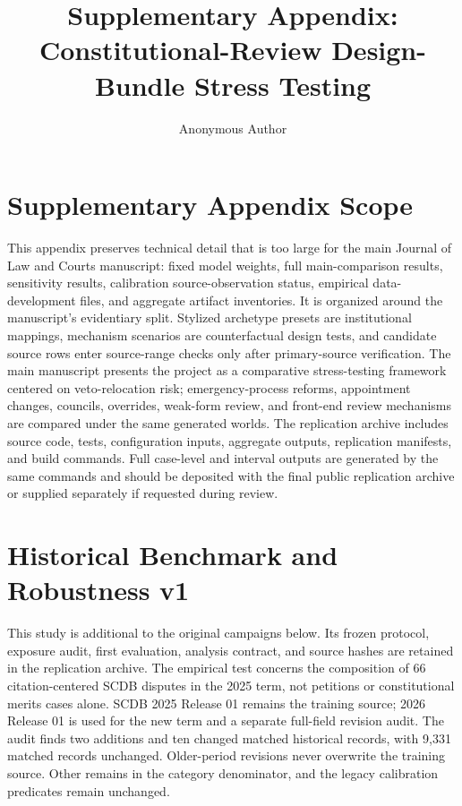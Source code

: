 \documentclass[
  journal=small,
  manuscript=research-article,
  year=2026
]{cup-journal}
\title{Supplementary Appendix: Constitutional-Review Design-Bundle Stress Testing}
\author{Anonymous Author}
\affiliation{Manuscript prepared for anonymous review}
\date{}
\begin{document}
\maketitle

\section*{Supplementary Appendix Scope}

This appendix preserves technical detail that is too large for the main Journal of Law and Courts manuscript: fixed model weights, full main-comparison results, sensitivity results, calibration source-observation status, empirical data-development files, and aggregate artifact inventories. It is organized around the manuscript's evidentiary split. Stylized archetype presets are institutional mappings, mechanism scenarios are counterfactual design tests, and candidate source rows enter source-range checks only after primary-source verification. The main manuscript presents the project as a comparative stress-testing framework centered on veto-relocation risk; emergency-process reforms, appointment changes, councils, overrides, weak-form review, and front-end review mechanisms are compared under the same generated worlds. The replication archive includes source code, tests, configuration inputs, aggregate outputs, replication manifests, and build commands. Full case-level and interval outputs are generated by the same commands and should be deposited with the final public replication archive or supplied separately if requested during review.

\section*{Historical Benchmark and Robustness v1}

This study is additional to the original campaigns below. Its frozen protocol, exposure audit, first evaluation, analysis contract, and source hashes are retained in the replication archive. The empirical test concerns the composition of 66 citation-centered SCDB disputes in the 2025 term, not petitions or constitutional merits cases alone. SCDB 2025 Release 01 remains the training source; 2026 Release 01 is used for the new term and a separate full-field revision audit. The audit finds two additions and ten changed matched historical records, with 9,331 matched records unchanged. Older-period revisions never overwrite the training source. Other remains in the category denominator, and the legacy calibration predicates remain unchanged.
\end{document}
